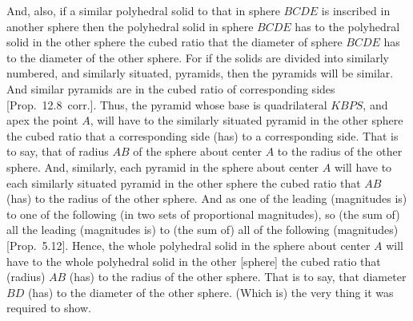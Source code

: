 \begin{Parallel}{}{}
{And, also, if a similar polyhedral solid  to that in sphere $BCDE$ is inscribed in another sphere then the polyhedral solid in sphere $BCDE$ has
to the polyhedral solid in the other sphere the cubed ratio that the diameter of sphere $BCDE$ has to the diameter of the other
sphere. For if the solids are divided into similarly numbered, and similarly situated, pyramids, then the pyramids will be
similar. And similar pyramids are in the cubed ratio of corresponding sides [Prop.~12.8~corr.]. 
Thus, the pyramid whose base is quadrilateral $KBPS$, and apex the point $A$, will have to the similarly situated pyramid in the other
sphere the cubed ratio that a corresponding side (has) to a corresponding side. That is to say, that of radius $AB$ of the
sphere about center $A$ to the radius of the other sphere. And, similarly, each pyramid in the sphere about center $A$ will have to
each similarly situated pyramid in the other sphere the cubed ratio that $AB$ (has) to the radius of the other sphere. And as
one of the leading (magnitudes is) to one of the following (in two sets of proportional magnitudes), so (the sum of) all the
leading (magnitudes is) to (the sum of) all of the following (magnitudes)  [Prop.~5.12]. 
Hence, the whole polyhedral solid in the sphere about center $A$ will have to the whole polyhedral solid in the other [sphere] the
cubed ratio that (radius) $AB$ (has) to the radius of the other sphere. That is to say, that diameter $BD$ (has) to the diameter of the
other sphere. (Which is) the very thing it was required to show.}
\end{Parallel}

